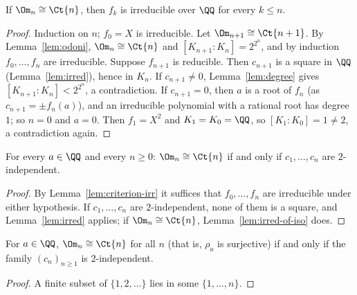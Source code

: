 \begin{lemma}
  \label{lem:irred-of-iso}
  \leanok
  If $\Om_n \cong \Ct{n}$, then $f_k$ is irreducible over $\QQ$ for every $k \le n$.
\end{lemma}
\begin{proof}
  \leanok
  Induction on $n$; $f_0 = X$ is irreducible. Let $\Om_{n+1} \cong \Ct{n+1}$. By
  Lemma~\ref{lem:odoni}, $\Om_n \cong \Ct{n}$ and $[K_{n+1} : K_n] = 2^{2^n}$, and by induction
  $f_0, \dots, f_n$ are irreducible. Suppose $f_{n+1}$ is reducible. Then $c_{n+1}$ is a square
  in $\QQ$ (Lemma~\ref{lem:irred}), hence in $K_n$. If $c_{n+1} \ne 0$, Lemma~\ref{lem:degree}
  gives $[K_{n+1} : K_n] < 2^{2^n}$, a contradiction. If $c_{n+1} = 0$, then $a$ is a root of
  $f_n$ (as $c_{n+1} = \pm f_n(a)$), and an irreducible polynomial with a rational root has
  degree~$1$; so $n = 0$ and $a = 0$. Then $f_1 = X^2$ and $K_1 = K_0 = \QQ$, so
  $[K_1 : K_0] = 1 \ne 2$, a contradiction again.
\end{proof}

\begin{theorem}
  \label{thm:criterion}
  \leanok
  For every $a \in \QQ$ and every $n \ge 0$: $\Om_n \cong \Ct{n}$ if and only if
  $c_1, \dots, c_n$ are $2$-independent.
\end{theorem}
\begin{proof}
  \leanok
  By Lemma~\ref{lem:criterion-irr} it suffices that $f_0, \dots, f_n$ are irreducible under
  either hypothesis. If $c_1, \dots, c_n$ are $2$-independent, none of them is a square, and
  Lemma~\ref{lem:irred} applies; if $\Om_n \cong \Ct{n}$, Lemma~\ref{lem:irred-of-iso} does.
\end{proof}

\begin{theorem}
  \label{thm:criterion-infinite}
  \leanok
  For $a \in \QQ$, $\Om_n \cong \Ct{n}$ for all $n$ (that is, $\rho_a$ is surjective) if and only
  if the family $(c_n)_{n \ge 1}$ is $2$-independent.
\end{theorem}
\begin{proof}
  \leanok
  A finite subset of $\{1, 2, \dots\}$ lies in some $\{1, \dots, n\}$.
\end{proof}

